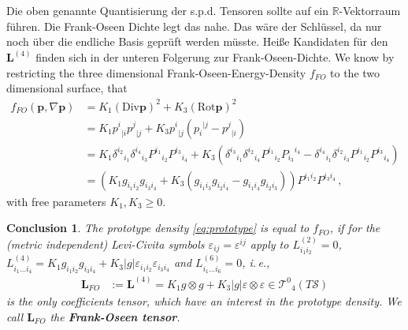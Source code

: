 \documentclass{scrartcl}
\newcommand{\germanred}[1]{{\color{red}\selectlanguage{ngerman}#1\selectlanguage{english}}}
\newcommand{\R}{\mathbb{R}}
\newcommand{\Div}{\text{Div}}
\newcommand{\Rot}{\text{Rot}}
\newcommand{\ie}{i.\,e.}%
\newcommand{\formComma}{\,\text{,}}
\newcommand{\pb}{\mathbf{p}}%
\newcommand{\Lb}{\mathbf{L}}%
\newcommand{\surf}{\mathcal{S}}
\newcommand{\sftensor}[3]{{{#1}^{#2}}_{#3}}
\newcommand{\fstensor}[3]{{{#1}_{#2}}^{#3}}
\newtheorem{conclusion}{Conclusion}
\begin{document}
      \germanred{Die oben genannte Quantisierung der s.p.d. Tensoren sollte auf ein \( \R \)-Vektorraum führen.
      Die Frank-Oseen Dichte legt das nahe.
      Das wäre der Schlüssel, da nur noch über die endliche Basis geprüft werden müsste.
      Heiße Kandidaten für den \( \Lb^{(4)} \) finden sich in der unteren Folgerung zur Frank-Oseen-Dichte.}
      We know by restricting the three dimensional Frank-Oseen-Energy-Density \( f_{FO} \) to the two dimensional surface, that
      \begin{align}
        f_{FO}(\pb, \nabla\pb)
            &= K_{1}(\Div\pb)^{2} + K_{3}(\Rot\pb)^{2} \\
            &= K_{1}\sftensor{p}{i}{|i}\sftensor{p}{j}{|j}
              +K_{3}\sftensor{p}{i}{|j}\left(  \fstensor{p}{i}{|j} -  \sftensor{p}{j}{|i}\right) \\
            &= K_{1}\sftensor{\delta}{i_{2}}{i_{1}}\sftensor{\delta}{i_{4}}{i_{3}}\sftensor{P}{i_{1}}{i_{2}}\sftensor{P}{i_{3}}{i_{4}}
              +K_{3}\left(
                  \sftensor{\delta}{i_{3}}{i_{1}}\sftensor{\delta}{i_{2}}{i_{4}}\sftensor{P}{i_{1}}{i_{2}}\fstensor{P}{i_{3}}{i_{4}}  
                - \sftensor{\delta}{i_{4}}{i_{1}}\sftensor{\delta}{i_{2}}{i_{3}}\sftensor{P}{i_{1}}{i_{2}}\sftensor{P}{i_{3}}{i_{4}}
                         \right) \\
            &= \left(K_{1}g_{i_{1}i_{2}}g_{i_{3}i_{4}}
               +K_{3}\left( 
                g_{i_{1}i_{3}}g_{i_{2}i_{4}} - g_{i_{1}i_{4}}g_{i_{2}i_{3}} 
                      \right) \right)P^{i_{1}i_{2}}P^{i_{3}i_{4}} \label{eq:uncreative1}\formComma
      \end{align}
      with free parameters \( K_{1},K_{3}\ge 0 \).
      \begin{conclusion}\label{concl:frankoseentensors}
        The prototype density \eqref{eq:prototype} is equal to \( f_{FO} \), if 
        for the (metric independent) Levi-Civita symbols \( \varepsilon_{ij}=\varepsilon^{ij} \) apply to 
        \( L^{(2)}_{i_{1}i_{2}} = 0 \), 
        \( L^{(4)}_{i_{1}\ldots i_{4}} = K_{1}g_{i_{1}i_{2}}g_{i_{3}i_{4}} + K_{3}|g|\varepsilon_{i_{1}i_{2}}\varepsilon_{i_{3}i_{4}} \)
        and \( L^{(6)}_{i_{1}\ldots i_{6}} = 0 \),
        \ie, 
        \begin{align}
          \Lb_{FO}&:= \Lb^{(4)} = K_{1} g \otimes g + K_{3}|g| \varepsilon \otimes \varepsilon \in \sftensor{\mathcal{T}}{0}{4}(T\surf)
        \end{align}
        is the only coefficients tensor, which have an interest in the prototype density.
        We call \( \Lb_{FO} \) the \textbf{Frank-Oseen tensor}.
      \end{conclusion}
\end{document}
